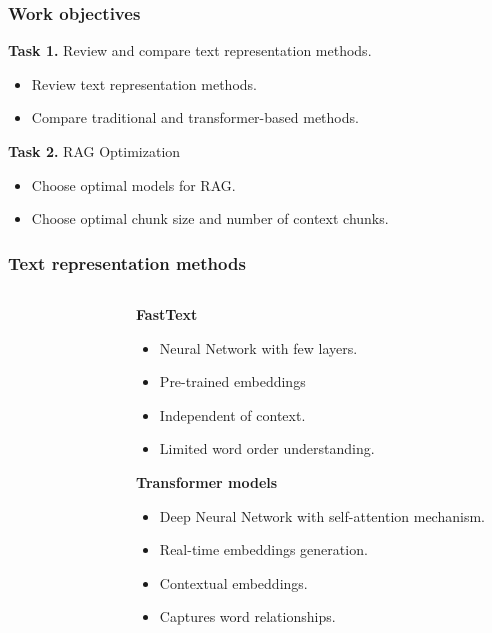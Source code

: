 \documentclass{beamer}
\begin{document}
\begin{frame}
\end{frame}


\begin{frame}
  \frametitle{Work objectives}
  \textcolor{cvut_navy}{\textbf{Task 1.}} Review and compare text representation methods.
  \begin{itemize}
    \item Review text representation methods.
    \item Compare traditional and transformer-based methods.
  \end{itemize}
  \textcolor{cvut_navy}{\textbf{Task 2.}} RAG Optimization
  \begin{itemize}
    \item Choose optimal models for RAG.
    \item Choose optimal chunk size and number of context chunks.
  \end{itemize}
  \bigskip
  
\end{frame}


\begin{frame}[t]
  \frametitle{Text representation methods}
  \begin{columns}[onlytextwidth]
    \begin{column}{0.5\textwidth}
      \begin{figure}
        
      \end{figure}
    \end{column}
    \begin{column}{0.55\textwidth}
      \textcolor{cvut_navy}{\textbf{FastText}}
      \begin{itemize}
        \item Neural Network with few layers.      
        \item Pre-trained embeddings
        \item Independent of context.
        \item Limited word order understanding.        
      \end{itemize}
      \textcolor{cvut_navy}{\textbf{Transformer models}}
      \begin{itemize}
        \item Deep Neural Network with self-attention mechanism.
        \item Real-time embeddings generation.
        \item Contextual embeddings.        
        \item Captures word relationships.
      \end{itemize}
    \end{column}
  \end{columns}
\end{frame}
\end{document}
